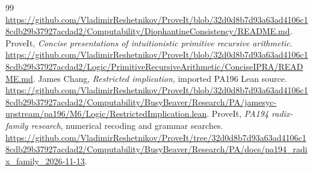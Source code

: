 \documentclass[11pt]{article}
\theoremstyle{definition}\newtheorem{definition}[theorem]{Definition}
\begin{document}
\begin{thebibliography}{99}
\url{https://github.com/VladimirReshetnikov/ProveIt/blob/32d0d8b7d93a63ad4106c18cdb29b37927acdad2/Computability/DiophantineConsistency/README.md}.
 ProveIt, \emph{Concise presentations of intuitionistic primitive recursive arithmetic}.
\url{https://github.com/VladimirReshetnikov/ProveIt/blob/32d0d8b7d93a63ad4106c18cdb29b37927acdad2/Logic/PrimitiveRecursiveArithmetic/ConciseIPRA/README.md}.
 James Chang, \emph{Restricted implication}, imported PA196 Lean source.
\url{https://github.com/VladimirReshetnikov/ProveIt/blob/32d0d8b7d93a63ad4106c18cdb29b37927acdad2/Computability/BusyBeaver/Research/PA/jamesyc-upstream/pa196/M6/Logic/RestrictedImplication.lean}.
 ProveIt, \emph{PA194 radix-family research}, numerical recoding and grammar searches.
\url{https://github.com/VladimirReshetnikov/ProveIt/tree/32d0d8b7d93a63ad4106c18cdb29b37927acdad2/Computability/BusyBeaver/Research/PA/docs/pa194_radix_family_2026-11-13}.
\end{thebibliography}
\end{document}
